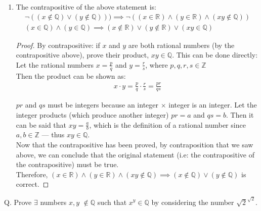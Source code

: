\documentclass[11pt]{article}
\begin{document}
\begin{enumerate}
{\begin{enumerate}
\item {
The contrapositive of the above statement is: 
\begin{align*}
\lnot ((x \notin \mathbb{Q}) \lor (y \notin \mathbb{Q}))) \implies \lnot ((x \in \mathbb{R}) \wedge (y \in \mathbb{R}) \wedge (xy \notin \mathbb{Q}))\\
(x \in \mathbb{Q}) \wedge (y \in \mathbb{Q}) \implies (x \notin \mathbb{R}) \lor (y \notin \mathbb{R}) \lor (xy \in \mathbb{Q})
\end{align*}

\begin{proof}
By contrapositive: if $x$ and $y$ are both rational numbers (by the contrapositive above), prove their product, $xy \in \mathbb{Q}$. This can be done directly:\\

Let the rational numbers $x = \frac{p}{q}$ and $y = \frac{r}{s}$, where $p,q,r,s \in \mathbb{Z}$\\

Then the product can be shown as:
\begin{align}
x\cdot y = \frac{p}{q} \cdot \frac{r}{s} = \frac{pr}{qs}
\end{align}

$pr$ and $qs$ must be integers because an integer $\times$ integer is an integer. Let the integer products (which produce another integer) $pr = a$ and $qs = b$. Then it can be said that $xy = \frac{a}{b}$, which is the definition of a rational number since $a, b \in \mathbb{Z}$ --- thus $xy \in \mathbb{Q}$.\\

Now that the contrapositive has been proved, by contraposition that we saw above, we can conclude that the original statement (i.e: the contrapositive of the contrapositive) must be true.\\ %

Therefore, $(x \in \mathbb{R}) \wedge (y \in \mathbb{R}) \wedge (xy \notin \mathbb{Q}) \implies (x \notin \mathbb{Q}) \lor (y \notin \mathbb{Q})$ is correct.
\end{proof}

}

\end{enumerate}

\item { %
Q. Prove $\exists$ numbers $x, y$ $\notin \mathbb{Q}$ such that $x^y \in \mathbb{Q}$ by considering the number $\sqrt{2}^{\sqrt{2}}$. \\

}}
\end{enumerate}
\end{document}
